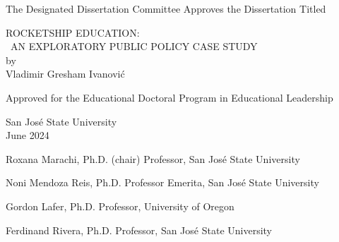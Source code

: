 
\begin{vplace}%
\OnehalfSpacing%
\begin{center}
The Designated Dissertation Committee Approves the Dissertation Titled\\
\vspace{2\baselineskip}

ROCKETSHIP EDUCATION:\\\vspace{1ex}
~AN EXPLORATORY PUBLIC POLICY CASE STUDY\\
by\\
Vladimir Gresham Ivanović\\
\vspace{2\baselineskip}

Approved for the Educational Doctoral Program in Educational Leadership\\
\vspace{2\baselineskip}

San José State University\\
\vspace{2\baselineskip}
June 2024\\
\vspace{4\baselineskip}
\end{center}



Roxana Marachi, Ph.D. (chair)\hfill{} Professor, San José State University\\
\vspace{\baselineskip}

Noni Mendoza Reis, Ph.D.\hfill{} Professor Emerita, San José State University\\
\vspace{\baselineskip}

Gordon Lafer, Ph.D.\hfill{} Professor, University of Oregon
\vspace{\baselineskip}

Ferdinand Rivera, Ph.D.\hfill{} Professor, San José State University

\end{vplace}

\thispagestyle{empty}

